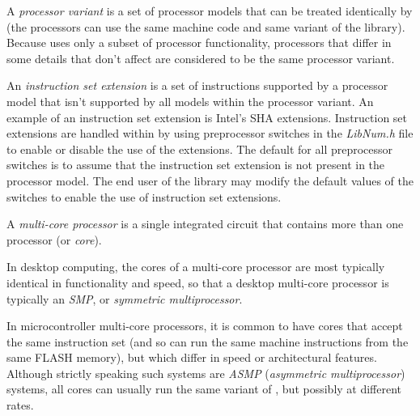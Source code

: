A \emph{processor variant} is a set 
of processor models that can be treated identically by 
\emph{\productbasenameshort{}} (the processors can use the 
same machine code and same variant of the 
\emph{\productbasenameshort{}} library).  Because 
\emph{\productbasenameshort{}} uses only a subset of 
processor functionality, processors that differ in some 
details that don't affect \emph{\productbasenameshort{}} are 
considered to be the same processor variant.  

An \emph{instruction set 
extension} is a set of instructions supported by a processor 
model that isn't supported by all models within the 
processor variant.  An example of an instruction set 
extension is Intel's SHA extensions.  Instruction set 
extensions are handled within \emph{\productbasenameshort{}} 
by using preprocessor switches in the \emph{LibNum.h} file 
to enable or disable the use of the extensions.  The default
for all preprocessor switches is to assume that the 
instruction set extension is not present in the processor 
model.  The end user of the library may modify the default 
values of the switches to enable the use of instruction set 
extensions.

A \emph{multi-core processor} is 
a single integrated circuit that contains more than one 
processor (or \emph{core}).  

In desktop computing, the cores of a multi-core processor 
are most typically identical in functionality and speed, so 
that a desktop multi-core processor is typically an 
\emph{SMP}, or 
\emph{symmetric 
multiprocessor}.  

In microcontroller multi-core processors, it is common to 
have cores that accept the same instruction set (and so can 
run the same machine instructions from the same FLASH 
memory), but which differ in speed or architectural 
features.  Although strictly speaking such systems are 
\emph{ASMP} (\emph{asymmetric multiprocessor}) systems, 
all cores can usually run the same variant of
\emph{\productbasenameshort{}}, but possibly at different 
rates.  

